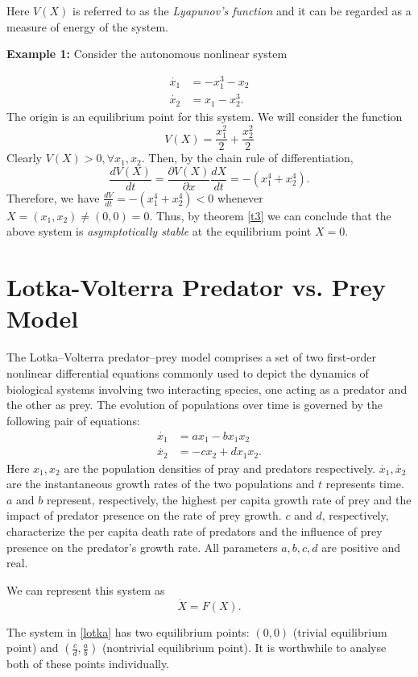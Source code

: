 \documentclass{article}
\begin{document}
Here $V(X)$ is referred to as the \emph{Lyapunov's function} and it can be regarded as a measure of energy of the system.

\textbf{Example 1:} Consider the autonomous nonlinear system

\begin{align*}
  \dot{x_1} &= -x_1^3-x_2\\
  \dot{x_2} &= x_1 - x_2^3.
\end{align*}
The origin is an equilibrium point for this system. We will consider the function 
$$V(X) = \frac{x_1^2}{2}+\frac{x_2^2}{2}$$
Clearly $V(X)>0, \forall x_1,x_2.$ Then, by the chain rule of differentiation, 
$$\frac{dV(X)}{dt} = \frac{\partial{V(X)}}{\partial{x}}\frac{dX}{dt} = -(x_1^4+x_2^4).$$
Therefore, we have $\frac{dV}{dt}=-(x_1^4+x_2^4)<0$ whenever $X=(x_1,x_2)\neq (0,0) = 0.$ Thus, by theorem \eqref{t3} we can conclude that the above system is \emph{asymptotically stable} at the equilibrium point $X=0.$

\section{Lotka-Volterra Predator vs. Prey Model}
The Lotka–Volterra predator–prey model comprises a set of two first-order nonlinear differential equations commonly used to depict the dynamics of biological systems involving two interacting species, one acting as a predator and the other as prey. The evolution of populations over time is governed by the following pair of equations:
\begin{align*}
  \dot{x_1} &= ax_1-bx_1x_2\\
  \dot{x_2} &= -cx_2 + dx_1x_2.
\end{align*}
Here $x_1,x_2$ are the population densities of pray and predators respectively. $\dot{x_1},\dot{x_2}$ are the instantaneous growth rates of the two populations and $t$ represents time. $a$ and $b$ represent, respectively, the highest per capita growth rate of prey and the impact of predator presence on the rate of prey growth. $c$ and $d$, respectively, characterize the per capita death rate of predators and the influence of prey presence on the predator's growth rate. All parameters $a,b,c,d$ are positive and real.

We can represent this system as
\begin{equation}\label{lotka}
    \dot{X}=F(X).
\end{equation}

The system in \eqref{lotka} has two equilibrium points: $(0,0)$ (trivial equilibrium point) and $(\frac{c}{d},\frac{a}{b})$ (nontrivial equilibrium point). It is worthwhile to analyse both of these points individually. 
\end{document}
